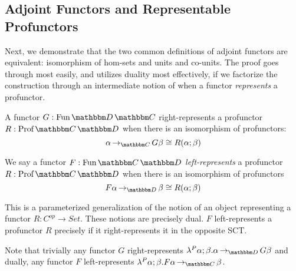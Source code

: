 \documentclass{llncs}
\begin{document}
\subsection{Adjoint Functors and Representable Profunctors}

Next, we demonstrate that the two common definitions of adjoint
functors are equivalent: isomorphism of hom-sets and units and
co-units.
%
The proof goes through most easily, and utilizes duality most
effectively, if we factorize the construction through an intermediate
notion of when a functor \emph{represents} a profunctor.

\begin{definition}
  A functor $G : \varr{\cat D}{\cat C}$ right-represents a profunctor $R :
  \harr {\cat C}{\cat D}$ when there is an isomorphism of profunctors:
  \[ \punitinXfromYtoZ {\cat C} {\alpha} {G \beta} \cong \harrapp R {\alpha}{\beta}\]

  We say a functor $F : \varr{\cat C}{\cat D}$ \emph{left-represents} a profunctor $R : \harr {\cat C}{\cat D}$ when there is an isomorphism of profunctors
  \[ \punitinXfromYtoZ {\cat D} {F \alpha} {\beta} \cong \harrapp R {\alpha}{\beta}\]
\end{definition}

This is a parameterized generalization of the notion of an object
representing a functor $R : C^{op} \to Set$.
These notions are precisely dual. $F$ left-represents a profunctor $R$
precisely if it right-represents it in the opposite SCT.

Note that trivially any functor $G$ right-represents
$\hlambda\alpha\beta \punitinXfromYtoZ {\cat D}{\alpha} {G \beta}$ and
dually, any functor $F$ left-represents
$\hlambda\alpha\beta\punitinXfromYtoZ {\cat C}{F\alpha}{\beta}$.
\end{document}
